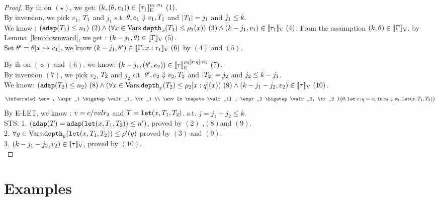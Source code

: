 \documentclass[a4paper,11pt]{article}
\theoremstyle{definition}
\begin{document}
\begin{proof}
By ih on $(\star)$, we get: $(k, (\theta,
e_1  )) \in [\![ \tau_1 ]\!]_{\text{E}}^{\rho_1, n_1}~(1)$.\\
%
By inversion, we pick $v_1$, $T_1$ and $j_1$ s.t. $\theta, e_1
\mathrel{\Downarrow} v_1, T_1$ and $|T_1| = j_1$ and $j_1 \leq k$.\\
%
We know : $ (\mathtt{adap}(T_1) \leq n_1) ~ (2) 
\land (\forall x \in \mbox{Vars}. \mathtt{depth}_{x}(T_1) \leq \rho_1(x)) ~ (3)
\land (k - j_1, v_1) \in [\![ \tau_1 ]\!]_{\text{V}} ~ (4)$.
%
From the assumption  $(k, \theta) \in [\![ \Gamma ]\!]_{\text{V}}$, by
Lemma~\ref{lem:downward}, we get : $(k-j_1, \theta) \in
[\![ \Gamma ]\!]_{\text{V}}~(5)$. \\
Set $\theta' = \theta[x \mapsto v_1]$, we know $(k-j_1, \theta')
\in [\![ \Gamma,x:\tau_1 ]\!]_{\text{V}} ~(6) $ by $(4)$ and $(5)$.
%

By ih on $(\diamond)$ and $(6)$, we know: $(k-j_1, (\theta',
e_2  )) \in [\![ \tau ]\!]_{\text{E}}^{\rho_2[x:q], n_2} ~(7) $.\\
%
By inversion $(7)$, we pick $v_2$, $T_2$ and $j_2$ s.t. $\theta', e_2
\mathrel{\Downarrow} v_2, T_2$ and $|T_2| = j_2$ and $j_2 \leq
k - j_1$.\\
%
We know:  $ (\mathtt{adap}(T_2) \leq n_2) ~ (8) 
\land (\forall x \in \mbox{Vars}. \mathtt{depth}_{x}(T_2) \leq \rho_2[x:q](x)) ~ (9)
\land (k - j_1 - j_2, v_2) \in [\![ \tau ]\!]_{\text{V}} ~ (10)$.
%
\[
\inferrule{
  \env, \expr_1 \bigstep \valr_1, \tr_1 \\
  \env[x \mapsto \valr_1] , \expr_2 \bigstep \valr_2, \tr_2
}
{\env, \elet x;q = \expr_1 \ein \expr_2 \bigstep \valr_2, \trlet (x,
  \tr_1, \tr_2) }
\]
By E-LET, we know : $v = c/valr_2$ and $T = \mathop{\mathtt{let}} (x,
  T_1, T_2)  $. s.t. $j = j_1 +j_2 \leq k$.\\
%
STS: 
%
1. $(\mathtt{adap}(T) = \mathtt{adap}(\mathop{\mathtt{let}} (x,
  T_1, T_2) ) \leq
n')$, proved by $(2)$ ,$(8)$and $(9)$.\\
2. $\forall y \in \mbox{Vars}. \mathtt{depth}_{y}(\mathop{\mathtt{let}} (x,
  T_1, T_2)  ) \leq
\rho'(y)$ proved by $(3)$ and $(9)$. \\
3. $(k - j_1 -j_2, v_2 )  \in [\![  
    \tau  ]\!]_{\text{V}}$, proved by $(10)$.\\

\end{proof}

\clearpage

\section{Examples}
\end{document}
